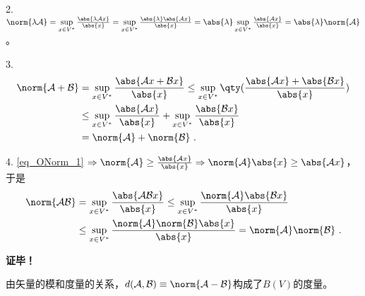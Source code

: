2.$\norm{\lambda\mathcal A}=\sup\limits_{x\in{V^*}}\frac{\abs{\lambda \mathcal Ax}}{\abs{x}}=\sup\limits_{x\in{V^*}}\frac{\abs{\lambda}\abs{ \mathcal Ax}}{\abs{x}}=\abs{\lambda}\sup\limits_{x\in{V^*}}\frac{\abs{\mathcal Ax}}{\abs{x}}=\abs{\lambda}\norm{\mathcal A}
$。

3.\begin{equation}
\begin{aligned}
\norm{\mathcal A+\mathcal B}&=\sup\limits_{x\in{V^*}}\frac{\abs{\mathcal Ax+\mathcal B x}}{\abs{x}}\leq\sup\limits_{x\in{V^*}}\qty(\frac{\abs{\mathcal Ax}+\abs{\mathcal B x}}{\abs{x}})\\
&\leq \sup\limits_{x\in{V^*}}\frac{\abs{ \mathcal Ax}}{\abs{x}}+\sup\limits_{x\in{V^*}}\frac{\abs{\mathcal B x}}{\abs{x}}\\
&=\norm{\mathcal A}+\norm{\mathcal B}~.
\end{aligned}
\end{equation}

4. \autoref{eq_ONorm_1} $\Rightarrow\norm{\mathcal A}\geq\frac{\abs{\mathcal Ax}}{\abs{x}}\Rightarrow \norm{\mathcal A}\abs{x}\geq\abs{\mathcal A x}$，于是
\begin{equation}
\begin{aligned}
\norm{\mathcal{AB}}&=\sup\limits_{x\in{V^*}}\frac{\abs{\mathcal{AB} x}}{\abs{x}}\leq\sup\limits_{x\in{V^*}}\frac{\norm{\mathcal A}\abs{\mathcal{B} x}}{\abs{x}}\\
&\leq\sup\limits_{x\in{V^*}}\frac{\norm{\mathcal A}\norm{\mathcal B}\abs{x}}{\abs{x}}=\norm{\mathcal A}\norm{\mathcal B}~.
\end{aligned}
\end{equation}

\textbf{证毕！}

由矢量的模和度量的关系，$d(\mathcal A,\mathcal B)\equiv\norm{\mathcal{A-B}}$构成了$B(V)$的度量。


